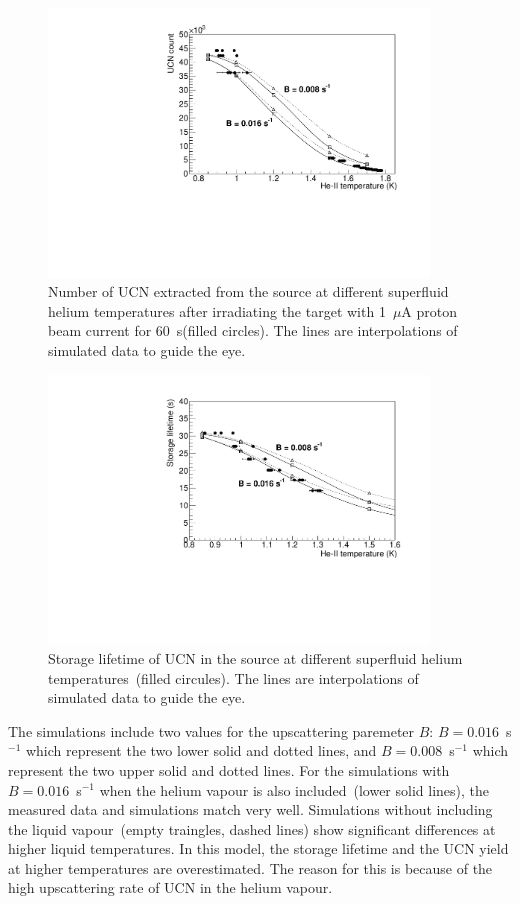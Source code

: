 \begin{figure}[h!]
  \centering
  \includegraphics[width=0.9\textwidth]{UCNCounts_vs_Temperature.pdf}
  \caption{Number of UCN extracted from the source at different
    superfluid helium temperatures after irradiating the target with
    1~$\mu$A proton beam current for 60~s(filled circles). The lines
    are interpolations of simulated data to guide the eye.}
  \label{fig:Counts_vs_temp_sim}
\end{figure}

\begin{figure}[h!]
  \centering
  \includegraphics[width=0.9\textwidth]{Storagelifetime_vs_Temp.pdf}
  \caption{Storage lifetime of UCN in the source at different
    superfluid helium temperatures~(filled circules). The lines are
    interpolations of simulated data to guide the eye.}
  \label{fig:storage_vs_temp_sim}
\end{figure}

The simulations include two values for the upscattering paremeter $B$:
$B= 0.016$~s$^{-1}$ which represent the two lower solid and dotted
lines, and $B= 0.008$~s$^{-1}$ which represent the two upper solid and
dotted lines. For the simulations with $B= 0.016$~s$^{-1}$ when the
helium vapour is also included~(lower solid lines), the measured data
and simulations match very well. Simulations 
without including the liquid vapour~(empty traingles, dashed
lines) show significant differences at higher liquid temperatures. In
this model, the storage lifetime and the UCN yield at higher
temperatures are overestimated. The reason for this is because of the
high upscattering rate of UCN in the helium vapour.


